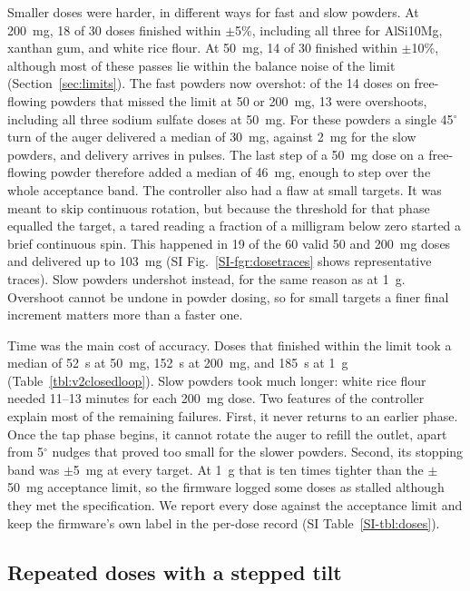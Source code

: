 \documentclass[twoside,twocolumn,9pt]{article}
\newcommand{\siref}[1]{\ref*{SI-#1}}
\begin{document}
Smaller doses were harder, in different ways for fast and slow powders. At 200~mg, 18 of 30 doses finished within $\pm$5\%, including all three for AlSi10Mg, xanthan gum, and white rice flour. At 50~mg, 14 of 30 finished within $\pm$10\%, although most of these passes lie within the balance noise of the limit (Section~\ref{sec:limits}). The fast powders now overshot: of the 14 doses on free-flowing powders that missed the limit at 50 or 200~mg, 13 were overshoots, including all three sodium sulfate doses at 50~mg. For these powders a single 45$^\circ$ turn of the auger delivered a median of 30~mg, against 2~mg for the slow powders, and delivery arrives in pulses. The last step of a 50~mg dose on a free-flowing powder therefore added a median of 46~mg, enough to step over the whole acceptance band. The controller also had a flaw at small targets. It was meant to skip continuous rotation, but because the threshold for that phase equalled the target, a tared reading a fraction of a milligram below zero started a brief continuous spin. This happened in 19 of the 60 valid 50 and 200~mg doses and delivered up to 103~mg (SI Fig.~\siref{fgr:dosetraces} shows representative traces). Slow powders undershot instead, for the same reason as at 1~g. Overshoot cannot be undone in powder dosing, so for small targets a finer final increment matters more than a faster one.

Time was the main cost of accuracy. Doses that finished within the limit took a median of 52~s at 50~mg, 152~s at 200~mg, and 185~s at 1~g (Table~\ref{tbl:v2closedloop}). Slow powders took much longer: white rice flour needed 11--13 minutes for each 200~mg dose. Two features of the controller explain most of the remaining failures. First, it never returns to an earlier phase. Once the tap phase begins, it cannot rotate the auger to refill the outlet, apart from 5$^\circ$ nudges that proved too small for the slower powders. Second, its stopping band was $\pm$5~mg at every target. At 1~g that is ten times tighter than the $\pm$50~mg acceptance limit, so the firmware logged some doses as stalled although they met the specification. We report every dose against the acceptance limit and keep the firmware's own label in the per-dose record (SI Table~\siref{tbl:doses}).

\subsection{Repeated doses with a stepped tilt}
\label{sec:stepped}
\end{document}
